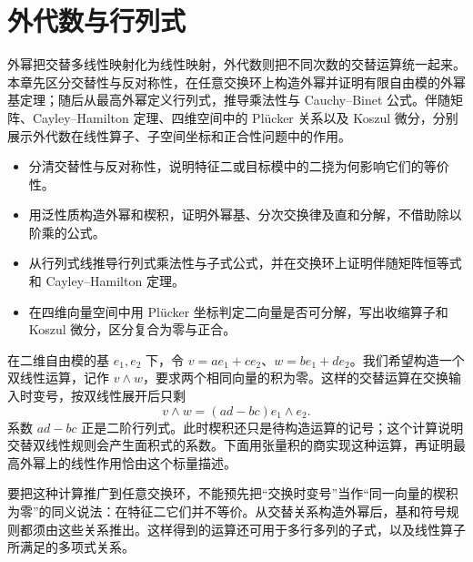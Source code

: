 
\chapter{外代数与行列式}
\label{b2:ch:09}

\begin{chapterabstract}
	外幂把交替多线性映射化为线性映射，外代数则把不同次数的交替运算统一起来。本章先区分交替性与反对称性，在任意交换环上构造外幂并证明有限自由模的外幂基定理；随后从最高外幂定义行列式，推导乘法性与 Cauchy–Binet 公式。伴随矩阵、Cayley–Hamilton 定理、四维空间中的 Plücker 关系以及 Koszul 微分，分别展示外代数在线性算子、子空间坐标和正合性问题中的作用。
\end{chapterabstract}

\begin{learninggoals}
	\begin{itemize}
		\item 分清交替性与反对称性，说明特征二或目标模中的二挠为何影响它们的等价性。
		\item 用泛性质构造外幂和楔积，证明外幂基、分次交换律及直和分解，不借助除以阶乘的公式。
		\item 从行列式线推导行列式乘法性与子式公式，并在交换环上证明伴随矩阵恒等式和 Cayley–Hamilton 定理。
		\item 在四维向量空间中用 Plücker 坐标判定二向量是否可分解，写出收缩算子和 Koszul 微分，区分复合为零与正合。
	\end{itemize}
\end{learninggoals}

在二维自由模的基 \(e_1,e_2\) 下，令 \(v=ae_1+ce_2\)、\(w=be_1+de_2\)。我们希望构造一个双线性运算，记作 \(v\wedge w\)，要求两个相同向量的积为零。这样的交替运算在交换输入时变号，按双线性展开后只剩
\[
	v\wedge w=(ad-bc)e_1\wedge e_2.
\]
系数 \(ad-bc\) 正是二阶行列式。此时楔积还只是待构造运算的记号；这个计算说明交替双线性规则会产生面积式的系数。下面用张量积的商实现这种运算，再证明最高外幂上的线性作用恰由这个标量描述。

\ProseParagraphBreak

要把这种计算推广到任意交换环，不能预先把“交换时变号”当作“同一向量的楔积为零”的同义说法：在特征二它们并不等价。从交替关系构造外幂后，基和符号规则都须由这些关系推出。这样得到的运算还可用于多行多列的子式，以及线性算子所满足的多项式关系。

\ProseParagraphBreak

